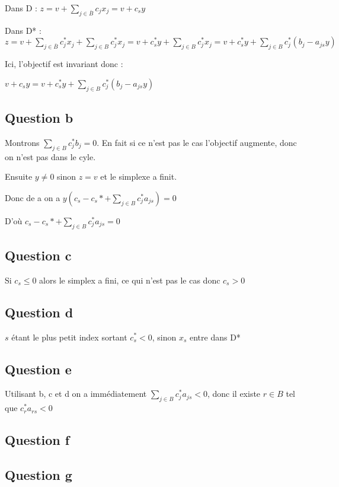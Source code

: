 \documentclass{article}
\begin{document}
Dans D : $z=v+\sum_{j\in \bar{B}}c_j x_j=v+c_s y$

Dans D* : $z=v+\sum_{j\in \bar{B}}c_j^* x_j+\sum_{j\in B}c_j^* x_j=v+c_s^* y+\sum_{j\in B}c_j^* x_j=v+c_s^* y+\sum_{j\in B}c_j^* (b_j-a_{js}y)$

Ici, l'objectif est invariant donc :

$v+c_s y=v+c_s^* y+\sum_{j\in B}c_j^* (b_j-a_{js}y)$

\subsection*{Question b}

Montrons $\sum_{j\in B}c_j^* b_j=0$. En fait si ce n'est pas le cas l'objectif augmente, donc on n'est pas dans le cyle.

Ensuite $y\neq 0$ sinon $z = v$ et le simplexe a finit.

Donc de a on a $y\left (c_s-c_s*+\sum_{j\in B}c_j^* a_{js}\right )=0$

D'où $c_s-c_s*+\sum_{j\in B}c_j^* a_{js}=0$


\subsection*{Question c}

Si $c_s\leq 0$ alors le simplex a fini, ce qui n'est pas le cas donc $c_s>0$

\subsection*{Question d}

$s$ étant le plus petit index sortant $c_s^*<0$, sinon $x_s$ entre dans D*

\subsection*{Question e} 

Utilisant b, c et d on a immédiatement $\sum_{j\in B}c_j^* a_{js}<0$, donc il existe $r \in B$ tel que $c_r^* a_{rs}<0$

\subsection*{Question f} 

\subsection*{Question g} 
\end{document}
